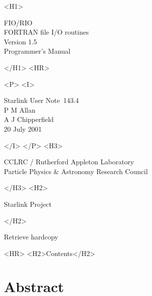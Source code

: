 \documentclass[twoside,11pt]{article}
\newcommand{\stardoccategory}  {Starlink User Note}
\newcommand{\stardocnumber}    {143.4}
\newcommand{\stardocauthors}   {P M Allan \\ A J Chipperfield}
\newcommand{\stardocdate}      {20 July 2001}
\newcommand{\stardoctitle}     {FIO/RIO \\ [1ex]
                                FORTRAN file I/O routines}
\newcommand{\stardocversion}   {Version 1.5}
\newcommand{\stardocmanual}    {Programmer's Manual}
\newcommand{\stardocsource}    {sun\stardocnumber}
\newcommand{\htmladdnormallink}[2]{#1}
\newcommand{\htmladdimg}[1]{}
\newcommand{\htmlref}[2]{#1}
\newcommand{\htmladdtonavigation}[1]{}
\newcommand{\xlabel}[1]{}
\renewcommand{\_}{\texttt{\symbol{95}}}
\begin{document}
\begin{htmlonly}
   \xlabel{}
   \begin{rawhtml} <H1> \end{rawhtml}
      \stardoctitle\\
      \stardocversion\\
      \stardocmanual
   \begin{rawhtml} </H1> <HR> \end{rawhtml}


   \begin{rawhtml} <P> <I> \end{rawhtml}
   \stardoccategory\ \stardocnumber \\
   \stardocauthors \\
   \stardocdate
   \begin{rawhtml} </I> </P> <H3> \end{rawhtml}
      \htmladdnormallink{CCLRC / Rutherford Appleton Laboratory}
                        {http://www.cclrc.ac.uk} \\
      \htmladdnormallink{Particle Physics \& Astronomy Research Council}
                        {http://www.pparc.ac.uk} \\
   \begin{rawhtml} </H3> <H2> \end{rawhtml}
      \htmladdnormallink{Starlink Project}{http://www.starlink.ac.uk/}
   \begin{rawhtml} </H2> \end{rawhtml}
   \htmladdnormallink{\htmladdimg{source.gif} Retrieve hardcopy}
      {http://www.starlink.ac.uk/cgi-bin/hcserver?\stardocsource}\\

  \label{stardoccontents}
  \begin{rawhtml} 
    <HR>
    <H2>Contents</H2>
  \end{rawhtml}
  \htmladdtonavigation{\htmlref{\htmladdimg{contents_motif.gif}}
        {stardoccontents}}

  \section{\xlabel{abstract}Abstract}
\end{htmlonly}
\end{document}
